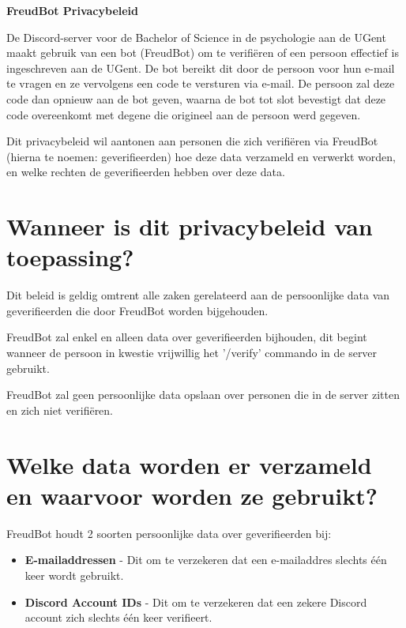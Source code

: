 \documentclass[12pt, a4paper]{article}
\begin{document}
	\begin{center}
		\vspace{1cm}
		\huge
		\textbf{FreudBot Privacybeleid}
		\vspace{1cm}
		\normalsize
	\end{center}

	De Discord-server voor de Bachelor of Science in de psychologie aan de
	UGent maakt gebruik van een bot (FreudBot) om te verifiëren of een persoon
	effectief is ingeschreven aan de UGent. De bot bereikt dit door de persoon
	voor hun e-mail te vragen en ze vervolgens een code te versturen via e-mail.
	De persoon zal deze code dan opnieuw aan de bot geven, waarna de bot tot
	slot bevestigt dat deze code overeenkomt met degene die origineel aan de
	persoon werd gegeven.

	Dit privacybeleid wil aantonen aan personen die zich verifiëren via
	FreudBot (hierna te noemen: geverifieerden) hoe deze data verzameld en
	verwerkt worden, en welke rechten de geverifieerden hebben over deze data.

	\section{Wanneer is dit privacybeleid van toepassing?}
	Dit beleid is geldig omtrent alle zaken gerelateerd aan de persoonlijke
	data van geverifieerden die door FreudBot worden bijgehouden.

	FreudBot zal enkel en alleen data over geverifieerden bijhouden, dit begint
	wanneer de persoon in kwestie vrijwillig het '/verify' commando in de
	server gebruikt.

	FreudBot zal geen persoonlijke data opslaan over personen die in de server
	zitten en zich niet verifiëren.

	\section{Welke data worden er verzameld en waarvoor worden ze gebruikt?}
	FreudBot houdt 2 soorten persoonlijke data over geverifieerden bij:
	\begin{itemize}
		\setlength{\itemsep}{0cm}
		\setlength{\parskip}{0cm}

		\item \textbf{E-mailaddressen} - Dit om te verzekeren dat een
		e-mailaddres slechts één keer wordt gebruikt.
		\item \textbf{Discord Account IDs} - Dit om te verzekeren dat een
		zekere Discord account zich slechts één keer verifieert.
	\end{itemize}
\end{document}
